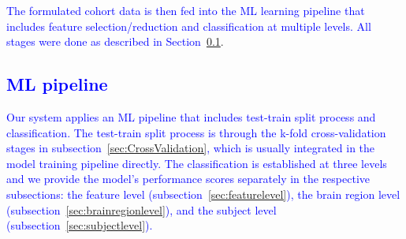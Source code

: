 \textcolor{blue}{The formulated cohort data is then fed into the ML learning pipeline that includes  feature selection/reduction and classification at multiple levels. All stages were done as described in Section~\ref{sec:MLpipeline}}.





\subsection{\textcolor{blue}{ ML pipeline}}
\label{sec:MLpipeline}


\textcolor{blue}{ Our system  applies  an  ML  pipeline  that  includes test-train split process and classification. The test-train split process is through the k-fold cross-validation stages in subsection~\ref{sec:CrossValidation}, which is usually integrated in the model training pipeline directly. The classification is established at three levels and we provide the model’s performance scores separately in the respective subsections: the feature level (subsection~\ref{sec:featurelevel}),  the brain region level (subsection~\ref{sec:brainregionlevel}), and the subject level (subsection~\ref{sec:subjectlevel}). }
 
